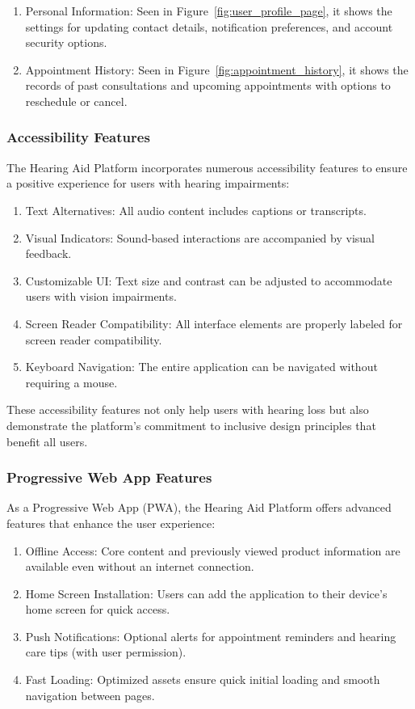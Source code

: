 \documentclass{article}
\begin{document}
\begin{enumerate}
    \item Personal Information: Seen in Figure~\ref{fig:user_profile_page}, it shows the settings for updating contact details, notification preferences, and account security options.
    \item Appointment History: Seen in Figure~\ref{fig:appointment_history}, it shows the records of past consultations and upcoming appointments with options to reschedule or cancel.
\end{enumerate}

\subsubsection{Accessibility Features}

The Hearing Aid Platform incorporates numerous accessibility features to ensure a positive experience for users with hearing impairments:

\begin{enumerate}
    \item Text Alternatives: All audio content includes captions or transcripts.
    \item Visual Indicators: Sound-based interactions are accompanied by visual feedback.
    \item Customizable UI: Text size and contrast can be adjusted to accommodate users with vision impairments.
    \item Screen Reader Compatibility: All interface elements are properly labeled for screen reader compatibility.
    \item Keyboard Navigation: The entire application can be navigated without requiring a mouse.
\end{enumerate}

These accessibility features not only help users with hearing loss but also demonstrate the platform's commitment to inclusive design principles that benefit all users.

\subsubsection{Progressive Web App Features}

As a Progressive Web App (PWA), the Hearing Aid Platform offers advanced features that enhance the user experience:

\begin{enumerate}
    \item Offline Access: Core content and previously viewed product information are available even without an internet connection.
    \item Home Screen Installation: Users can add the application to their device's home screen for quick access.
    \item Push Notifications: Optional alerts for appointment reminders and hearing care tips (with user permission).
    \item Fast Loading: Optimized assets ensure quick initial loading and smooth navigation between pages.
\end{enumerate}
\end{document}
